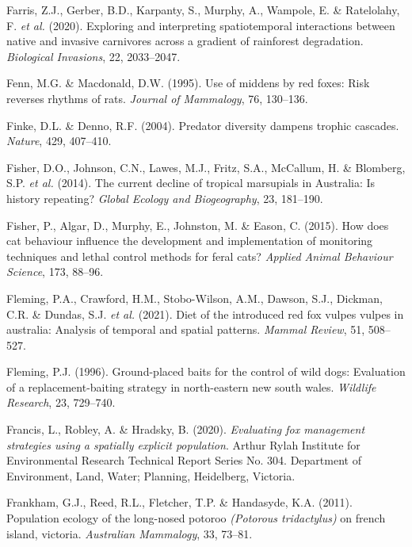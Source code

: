 \documentclass[11pt,a4paper,titlepage,twoside,openright]{style/unimelbthesis}
\begin{document}
\begin{mainmatter}
\leavevmode\hypertarget{ref-farris2020exploring}{}%
Farris, Z.J., Gerber, B.D., Karpanty, S., Murphy, A., Wampole, E. \& Ratelolahy, F. \emph{et al.} (2020). Exploring and interpreting spatiotemporal interactions between native and invasive carnivores across a gradient of rainforest degradation. \emph{Biological Invasions}, 22, 2033--2047.

\leavevmode\hypertarget{ref-fenn1995use}{}%
Fenn, M.G. \& Macdonald, D.W. (1995). Use of middens by red foxes: Risk reverses rhythms of rats. \emph{Journal of Mammalogy}, 76, 130--136.

\leavevmode\hypertarget{ref-finke2004predator}{}%
Finke, D.L. \& Denno, R.F. (2004). Predator diversity dampens trophic cascades. \emph{Nature}, 429, 407--410.

\leavevmode\hypertarget{ref-fisher2014current}{}%
Fisher, D.O., Johnson, C.N., Lawes, M.J., Fritz, S.A., McCallum, H. \& Blomberg, S.P. \emph{et al.} (2014). The current decline of tropical marsupials in Australia: Is history repeating? \emph{Global Ecology and Biogeography}, 23, 181--190.

\leavevmode\hypertarget{ref-fisher2015cat}{}%
Fisher, P., Algar, D., Murphy, E., Johnston, M. \& Eason, C. (2015). How does cat behaviour influence the development and implementation of monitoring techniques and lethal control methods for feral cats? \emph{Applied Animal Behaviour Science}, 173, 88--96.

\leavevmode\hypertarget{ref-fleming2021diet}{}%
Fleming, P.A., Crawford, H.M., Stobo-Wilson, A.M., Dawson, S.J., Dickman, C.R. \& Dundas, S.J. \emph{et al.} (2021). Diet of the introduced red fox vulpes vulpes in australia: Analysis of temporal and spatial patterns. \emph{Mammal Review}, 51, 508--527.

\leavevmode\hypertarget{ref-fleming1996ground}{}%
Fleming, P.J. (1996). Ground-placed baits for the control of wild dogs: Evaluation of a replacement-baiting strategy in north-eastern new south wales. \emph{Wildlife Research}, 23, 729--740.

\leavevmode\hypertarget{ref-francis2020evaluating}{}%
Francis, L., Robley, A. \& Hradsky, B. (2020). \emph{Evaluating fox management strategies using a spatially explicit population}. Arthur Rylah Institute for Environmental Research Technical Report Series No. 304. Department of Environment, Land, Water; Planning, Heidelberg, Victoria.

\leavevmode\hypertarget{ref-frankham2011population}{}%
Frankham, G.J., Reed, R.L., Fletcher, T.P. \& Handasyde, K.A. (2011). Population ecology of the long-nosed potoroo \emph{(Potorous tridactylus)} on french island, victoria. \emph{Australian Mammalogy}, 33, 73--81.


\end{mainmatter}
\end{document}
